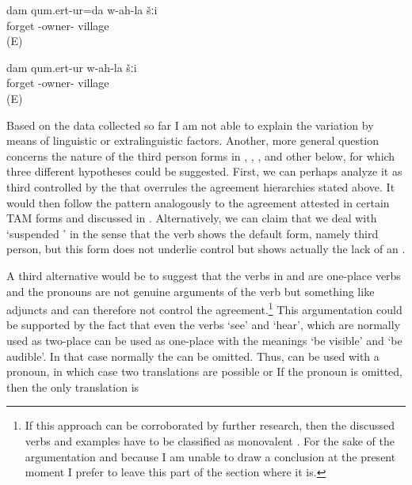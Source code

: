 \begin{exe}
	\ex	\label{ex:I (masc.) forgot my own village.A}
	\gll	dam qum.ert-ur=da w-ah-la šːi\\
	 	forget -owner- village\\
	\glt	{} (E)

	\ex	\label{ex:I (masc.) forgot my own village.B}
	\gll	dam qum.ert-ur w-ah-la šːi\\
		 	forget -owner- village\\
	\glt	{} (E)
\end{exe}

Based on the data collected so far I am not able to explain the variation by means of linguistic or extralinguistic factors. Another, more general question concerns the nature of the third person forms in , , , and other  below, for which three different hypotheses could be suggested. First, we can perhaps analyze it as third  controlled by the   that overrules the agreement hierarchies stated above. It would then follow the  pattern analogously to the  agreement attested in certain TAM forms and discussed in . Alternatively, we can claim that we deal with `suspended ' in the sense that the verb shows the default  form, namely third person, but this form does not underlie control but shows actually the lack of an . 

A third alternative would be to suggest that the verbs in  and  are one-place verbs and the  pronouns are not genuine arguments of the verb but something like adjuncts and can therefore not control the agreement.\footnote{If this approach can be corroborated by further research, then the discussed verbs and examples have to be classified as monovalent . For the sake of the argumentation and because I am unable to draw a conclusion at the present moment I prefer to leave this part of the section where it is.} This argumentation could be supported by the fact that even the verbs `see' and `hear', which are normally used as two-place  can be used as one-place  with the meanings `be visible' and `be audible'. In that case normally the   can be omitted. Thus,  can be used with a  pronoun, in which case two translations are possible  or  If the pronoun is omitted, then the only translation is 

